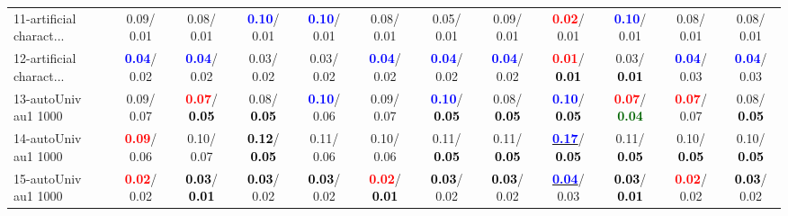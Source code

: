 \begin{table}[h]
\begin{center}
{\begin{tabular}{lc|c|c|c|c|c|c|c|c|c|c}
11-artificial charact... &   0.09/  0.01 &   0.08/  0.01 & \textcolor{blue}{\textbf{  0.10}}/  0.01 & \textcolor{blue}{\textbf{  0.10}}/  0.01 &   0.08/  0.01 &   0.05/  0.01 &   0.09/  0.01 & \textcolor{red}{\textbf{  0.02}}/  0.01 & \textcolor{blue}{\textbf{  0.10}}/  0.01 &   0.08/  0.01 &   0.08/  0.01 \\
12-artificial charact... & \textcolor{blue}{\textbf{  0.04}}/  0.02 & \textcolor{blue}{\textbf{  0.04}}/  0.02 &   0.03/  0.02 &   0.03/  0.02 & \textcolor{blue}{\textbf{  0.04}}/  0.02 & \textcolor{blue}{\textbf{  0.04}}/  0.02 & \textcolor{blue}{\textbf{  0.04}}/  0.02 & \textcolor{red}{\textbf{  0.01}}/\textcolor{black}{\textbf{  0.01}} &   0.03/\textcolor{black}{\textbf{  0.01}} & \textcolor{blue}{\textbf{  0.04}}/  0.03 & \textcolor{blue}{\textbf{  0.04}}/  0.03 \\
13-autoUniv au1 1000 &   0.09/  0.07 & \textcolor{red}{\textbf{  0.07}}/\textcolor{black}{\textbf{  0.05}} &   0.08/\textcolor{black}{\textbf{  0.05}} & \textcolor{blue}{\textbf{  0.10}}/  0.06 &   0.09/  0.07 & \textcolor{blue}{\textbf{  0.10}}/\textcolor{black}{\textbf{  0.05}} &   0.08/\textcolor{black}{\textbf{  0.05}} & \textcolor{blue}{\textbf{  0.10}}/\textcolor{black}{\textbf{  0.05}} & \textcolor{red}{\textbf{  0.07}}/\textcolor{darkgreen}{\textbf{  0.04}} & \textcolor{red}{\textbf{  0.07}}/  0.07 &   0.08/\textcolor{black}{\textbf{  0.05}} \\
14-autoUniv au1 1000 & \textcolor{red}{\textbf{  0.09}}/  0.06 &   0.10/  0.07 & \textcolor{black}{\textbf{  0.12}}/\textcolor{black}{\textbf{  0.05}} &   0.11/  0.06 &   0.10/  0.06 &   0.11/\textcolor{black}{\textbf{  0.05}} &   0.11/\textcolor{black}{\textbf{  0.05}} & \underline{\textcolor{blue}{\textbf{  0.17}}}/\textcolor{black}{\textbf{  0.05}} &   0.11/\textcolor{black}{\textbf{  0.05}} &   0.10/\textcolor{black}{\textbf{  0.05}} &   0.10/\textcolor{black}{\textbf{  0.05}} \\ \hline
15-autoUniv au1 1000 & \textcolor{red}{\textbf{  0.02}}/  0.02 & \textcolor{black}{\textbf{  0.03}}/\textcolor{black}{\textbf{  0.01}} & \textcolor{black}{\textbf{  0.03}}/  0.02 & \textcolor{black}{\textbf{  0.03}}/  0.02 & \textcolor{red}{\textbf{  0.02}}/\textcolor{black}{\textbf{  0.01}} & \textcolor{black}{\textbf{  0.03}}/  0.02 & \textcolor{black}{\textbf{  0.03}}/  0.02 & \underline{\textcolor{blue}{\textbf{  0.04}}}/  0.03 & \textcolor{black}{\textbf{  0.03}}/\textcolor{black}{\textbf{  0.01}} & \textcolor{red}{\textbf{  0.02}}/  0.02 & \textcolor{black}{\textbf{  0.03}}/  0.02 \\

\end{tabular}}
\end{center}
\end{table}
